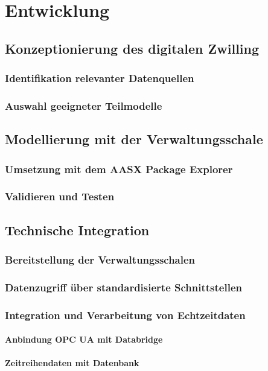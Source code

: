 \section{Entwicklung}
\subsection{Konzeptionierung des digitalen Zwilling}
\subsubsection{Identifikation relevanter Datenquellen}
\subsubsection{Auswahl geeigneter Teilmodelle}
\subsection{Modellierung mit der Verwaltungsschale}
\subsubsection{Umsetzung mit dem AASX Package Explorer}
\subsubsection{Validieren und Testen}
\subsection{Technische Integration}
\subsubsection{Bereitstellung der Verwaltungsschalen}
\subsubsection{Datenzugriff über standardisierte Schnittstellen}
\subsubsection{Integration und Verarbeitung von Echtzeitdaten}
\paragraph{Anbindung OPC UA mit Databridge}
\paragraph{Zeitreihendaten mit Datenbank}
